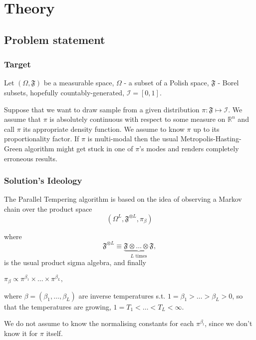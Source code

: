 \chapter{ Theory }	



\section*{Problem statement}

\subsection*{Target}
Let $(\Omega, \mathfrak{F})$ be a measurable space, $\Omega$ - a subset of a Polish space, $\mathfrak{F}$ - Borel subsets, hopefully countably-generated, $\mathcal{I} = [0,1]$.

Suppose that we want to draw sample from a given distribution $ \pi: \mathfrak{F} \mapsto \mathcal{I}$. We assume that $\pi$ is absolutely continuous with respect to some measure on $\mathbb{R}^n$ and call $\pi$ its appropriate density function. We assume to know $\pi$ up to its proportionality factor. If $\pi$ is multi-modal then the usual Metropolis-Hasting-Green algorithm might get stuck in one of $\pi$'s modes and renders completely erroneous results.


\subsection*{Solution's Ideology} 
The Parallel Tempering algorithm is based on the idea of observing a Markov chain over the product space $$(\Omega^L, \mathfrak{F}^{\otimes L}, \pi_\beta)$$


where 
	$$\mathfrak{F}^{\otimes L} \equiv \underbrace{\mathfrak{F} \otimes \dots \otimes \mathfrak{F}}_{\text{$L$ times}},$$
is the usual product sigma algebra, and finally 

\begin{assumptions}
	\item $\pi_\beta \propto \pi^{\beta_1} \times \dots \times \pi^{\beta_L},$\label{product form}
\end{assumptions}	

where $\beta = (\beta_1 , \dots , \beta_L)$ are inverse temperatures s.t. $1 = \beta_1 > \dots > \beta_L > 0$, so that the temperatures are growing, $1 = T_1 < \dots < T_L < \infty$.

 We do not assume to know the normalising constants for each $\pi^{\beta_l}$, since we don't know it for $\pi$ itself.

